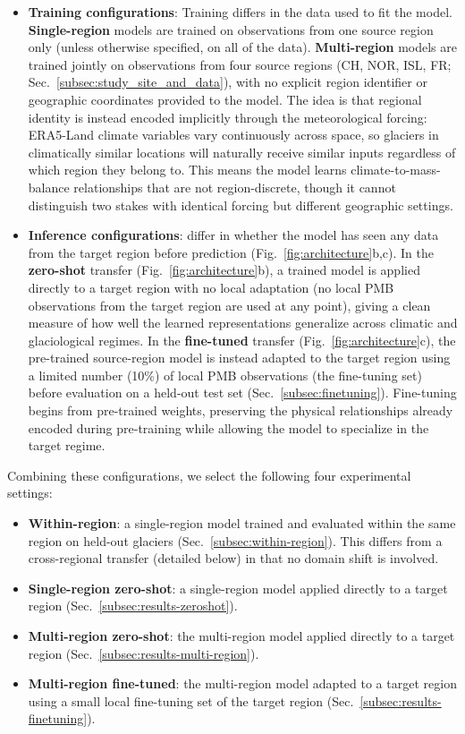 \documentclass[draft]{agujournal2019}
\begin{document}
\begin{itemize}
    \item \textbf{Training configurations}: Training differs in the data used to fit the model. \textbf{Single-region} models are trained on observations from one source region only (unless otherwise specified, on all of the data). \textbf{Multi-region} models are trained jointly on observations from four source regions (CH, NOR, ISL, FR; Sec.~\ref{subsec:study_site_and_data}), with no explicit region identifier or geographic coordinates provided to the model. The idea is that regional identity is instead encoded implicitly through the meteorological forcing: ERA5-Land climate variables vary continuously across space, so glaciers in climatically similar locations will naturally receive similar inputs regardless of which region they belong to. This means the model learns climate-to-mass-balance relationships that are not region-discrete, though it cannot distinguish two stakes with identical forcing but different geographic settings.
    
    \item \textbf{Inference configurations}: differ in whether the model has seen any data from the target region before prediction (Fig.~\ref{fig:architecture}b,c). In the \textbf{zero-shot} transfer (Fig.~\ref{fig:architecture}b), a trained model is applied directly to a target region with no local adaptation (no local PMB observations from the target region are used at any point), giving a clean measure of how well the learned representations generalize across climatic and glaciological regimes. In the \textbf{fine-tuned} transfer (Fig.~\ref{fig:architecture}c), the pre-trained source-region model is instead adapted to the target region using a limited number (10\%) of local PMB observations (the fine-tuning set) before evaluation on a held-out test set (Sec.~\ref{subsec:finetuning}). Fine-tuning begins from pre-trained weights, preserving the physical relationships already encoded during pre-training while allowing the model to specialize in the target regime.
\end{itemize}


Combining these configurations, we select the following four experimental settings:
\begin{itemize}
    \item \textbf{Within-region}: a single-region model trained and evaluated within the same region on held-out glaciers (Sec.~\ref{subsec:within-region}). This differs from a cross-regional transfer (detailed below) in that no domain shift is involved.
    \item \textbf{Single-region zero-shot}: a single-region model applied directly to a target region (Sec.~\ref{subsec:results-zeroshot}).
    \item \textbf{Multi-region zero-shot}: the multi-region model applied directly to a target region (Sec.~\ref{subsec:results-multi-region}).
    \item \textbf{Multi-region fine-tuned}: the multi-region model adapted to a target region using a small local fine-tuning set of the target region (Sec.~\ref{subsec:results-finetuning}).
\end{itemize}
\end{document}
